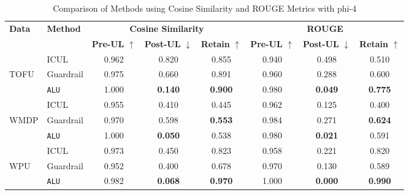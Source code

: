 \begin{table*}[]
    \centering
    \caption{Comparison of Methods using Cosine Similarity and ROUGE Metrics with phi-4}
    \begin{tabular}{llccc|ccc}
        \toprule
        \textbf{Data}&\textbf{Method} & \multicolumn{3}{c}{\textbf{Cosine Similarity}} & \multicolumn{3}{c}{\textbf{ROUGE}} \\
        \cmidrule(lr){3-5} \cmidrule(lr){6-8}
         & & \textbf{Pre-UL} $\uparrow$ & \textbf{Post-UL} $\downarrow$ & \textbf{Retain} $\uparrow$ & \textbf{Pre-UL} $\uparrow$ & \textbf{Post-UL} $\downarrow$ & \textbf{Retain} $\uparrow$ \\
        \midrule
        &ICUL & 0.962 & 0.820 & 0.855 & 0.940 & 0.498 & 0.510 \\
        TOFU &Guardrail & 0.975 & 0.660 & 0.891 & 0.960 & 0.288 & 0.600 \\
        &\texttt{ALU}  & 1.000 & \textbf{0.140} & \textbf{0.900} & 0.980 & \textbf{0.049} &\textbf{ 0.775} \\
        \midrule
        &ICUL  & 0.955 & 0.410 & 0.445 & 0.962 & 0.125 & 0.400 \\
        WMDP & Guardrail  & 0.970  & 0.598 & \textbf{0.553} & 0.984 & 0.271 & \textbf{0.624} \\
        &\texttt{ALU} & 1.000  & \textbf{0.050} & 0.538 & 0.980 & \textbf{0.021} & 0.591 \\
        \midrule
        &ICUL  & 0.973 & 0.450 & 0.823 & 0.958 & 0.221 & 0.820 \\
        WPU &Guardrail & 0.952 & 0.400 & 0.678 & 0.970 & 0.130 & 0.589 \\
        &\texttt{ALU} & 0.982 & \textbf{0.068} & \textbf{0.970 }& 1.000 & \textbf{0.000} & \textbf{0.990} \\
        
        \bottomrule
    \end{tabular}
\label{tab:t14}    
\end{table*}

